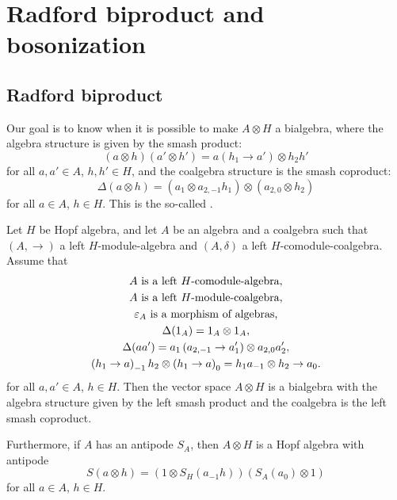 \section{Radford biproduct and bosonization}

\subsection{Radford biproduct}

Our goal is to know when it is possible to make $A\otimes H$ a bialgebra, where
the algebra structure is given by the smash product:
\[
(a\otimes h)(a'\otimes h')=a(h_{1}\to a')\otimes h_{2}h'
\]
for all $a,a'\in A$, $h,h'\in H$, and the coalgebra structure is
the smash coproduct:
\[
\Delta(a\otimes h)=(a_{1}\otimes a_{2,-1}h_{1})\otimes(a_{2,0}\otimes h_{2})
\]
for all $a\in A$, $h\in H$. This is the so-called .

\begin{theorem}
\label{theorem:radford}
Let $H$ be Hopf algebra, and let $A$ be an algebra and a coalgebra such that
$(A,\rightarrow)$ a left $H$-module-algebra and $(A,\delta)$ a left
$H$-comodule-coalgebra.  Assume that 
\begin{gather}
A\text{ is a left \ensuremath{H}-comodule-algebra},\label{eq:radford_1}\\
A\text{ is a left \ensuremath{H}-module-coalgebra,}\label{eq:radford_2}\\
\varepsilon_{A}\text{ is a morphism of algebras,}\label{eq:radford_3}\\
\Delta(1_{A})=1_{A}\otimes1_{A},\label{eq:radford_4}\\
\Delta(aa')=a_{1}\left(a_{2,-1}\rightarrow a'_{1}\right)\otimes a_{2,0}a'_{2},\label{eq:radford_5}\\
\left(h_{1}\rightarrow a\right)_{-1}h_{2}\otimes\left(h_{1}\rightarrow a\right)_{0}=h_{1}a_{-1}\otimes h_{2}\rightarrow a_{0}.\label{eq:radford_6}
\end{gather}
for all $a,a'\in A$, $h\in H$.
Then the vector space $A\otimes H$ is a bialgebra with the algebra structure
given by the left smash product and the coalgebra is the left smash coproduct.

Furthermore, if $A$ has an antipode $S_A$, then $A\otimes H$ is a Hopf algebra
with antipode
\[
S(a\otimes h)=(1\otimes S_{H}(a_{-1}h))(S_{A}(a_{0})\otimes1)
\]
for all $a\in A$, $h\in H$.
\end{theorem}

